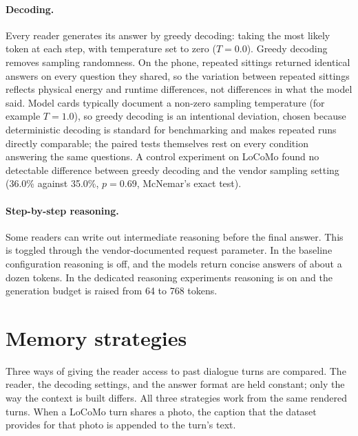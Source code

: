\paragraph{Decoding.} Every reader generates its answer by greedy decoding: taking the most likely
token at each step, with temperature set to zero ($T=0.0$). Greedy decoding removes sampling
randomness. On the phone, repeated sittings returned identical answers on every question they
shared, so the variation between repeated sittings reflects physical energy and runtime differences,
not differences in what the model said. Model cards typically document a non-zero sampling
temperature (for example $T=1.0$), so greedy decoding is an intentional deviation, chosen because
deterministic decoding is standard for benchmarking and makes repeated runs directly comparable; the
paired tests themselves rest on every condition answering the same questions. A
control experiment on LoCoMo found no detectable difference between greedy decoding and the vendor
sampling setting (36.0\% against 35.0\%, $p=0.69$, McNemar's exact test).

\paragraph{Step-by-step reasoning.} Some readers can write out intermediate reasoning before the
final answer. This is toggled through the vendor-documented request parameter. In the baseline
configuration reasoning is off, and the models return concise answers of about a dozen tokens. In the
dedicated reasoning experiments reasoning is on and the generation budget is raised from 64 to 768
tokens.

\section{Memory strategies}
\label{sec:strategies}

Three ways of giving the reader access to past dialogue turns are compared. The reader, the decoding
settings, and the answer format are held constant; only the way the context is built differs.
All three strategies work from the same rendered turns. When a LoCoMo turn shares a photo, the
caption that the dataset provides for that photo is appended to the turn's text.

